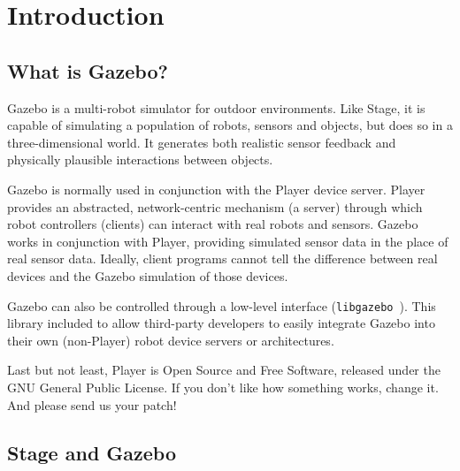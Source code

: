 \documentclass[11pt]{report}
\def\libgazebo {{\tt libgazebo}~}
\begin{document}

\newpage
\tableofcontents



\newpage
\setcounter{page}{0}

\chapter{Introduction}

\section{What is Gazebo?}

Gazebo is a multi-robot simulator for outdoor environments.  Like
Stage, it is capable of simulating a population of robots, sensors and
objects, but does so in a three-dimensional world. It generates both
realistic sensor feedback and physically plausible interactions
between objects.

Gazebo is normally used in conjunction with the Player device server.
Player provides an abstracted, network-centric mechanism (a server)
through which robot controllers (clients) can interact with real
robots and sensors.  Gazebo works in conjunction with Player, providing
simulated sensor data in the place of real sensor data.  Ideally,
client programs cannot tell the difference between real devices and
the Gazebo simulation of those devices.

Gazebo can also be controlled through a low-level interface
(\libgazebo).  This library included to allow third-party developers
to easily integrate Gazebo into their own (non-Player) robot device
servers or architectures.

Last but not least, Player is Open Source and Free Software, released
under the GNU General Public License.  If you don't like how something
works, change it.  And please send us your patch!


\section{Stage and Gazebo}
\end{document}
